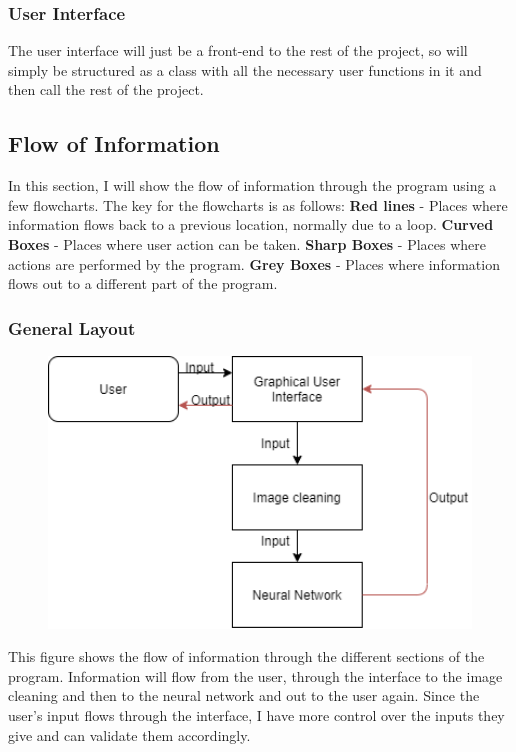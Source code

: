\documentclass{report}
\begin{document}
\subsubsection{User Interface}
The user interface will just be a front-end to the rest of the project, so will simply be structured as a class with all the necessary user functions in it and then call the rest of the project.

\subsection{Flow of Information}
In this section, I will show the flow of information through the program using a few flowcharts. The key for the flowcharts is as follows:
\newline
\textbf{Red lines} - Places where information flows back to a previous location, normally due to a loop.
\newline
\textbf{Curved Boxes} - Places where user action can be taken.
\newline
\textbf{Sharp Boxes} - Places where actions are performed by the program.
\newline
\textbf{Grey Boxes} - Places where information flows out to a different part of the program.

\subsubsection{General Layout}
\begin{figure}[H]
    \centering
    \includegraphics[width=12cm]{Images/Structure Of Program/Information Flow in Program Flow chart.png}
\end{figure}
This figure shows the flow of information through the different sections of the program. Information will flow from the user, through the interface to the image cleaning and then to the neural network and out to the user again. Since the user's input flows through the interface, I have more control over the inputs they give and can validate them accordingly.
\end{document}
